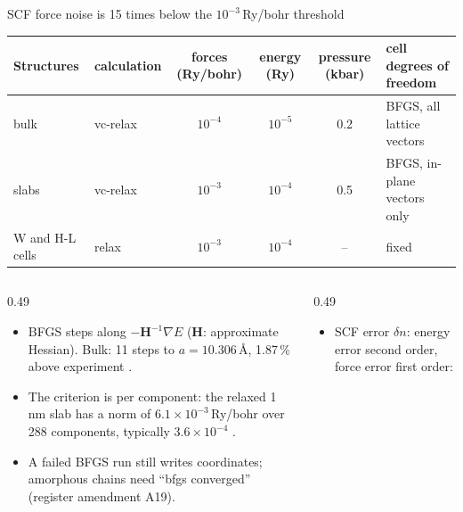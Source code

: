 \begin{frame}[t]{SCF force noise is 15 times below the $10^{-3}$\,Ry/bohr threshold}
  \fivedense\fiveTop
  \vspace{-1.8mm}
  \begingroup\scriptsize
  \renewcommand{\arraystretch}{0.95}
  \begin{tabularx}{\textwidth}{@{}l l c c c X@{}}
    \toprule
    Structures & calculation & forces (Ry/bohr) & energy (Ry) & pressure (kbar) & cell degrees of freedom \\
    \midrule
    bulk \InO{} & vc-relax & $10^{-4}$ & $10^{-5}$ & 0.2 & BFGS, all lattice vectors \\
    slabs & vc-relax & $10^{-3}$ & $10^{-4}$ & 0.5 & BFGS, in-plane vectors only \\
    W and H-L cells & relax & $10^{-3}$ & $10^{-4}$ & -- & fixed \\
    \bottomrule
  \end{tabularx}\par\endgroup
  \vspace{-1.5mm}
  \begin{columns}[T,onlytextwidth]
    \begin{column}{0.49\textwidth}
      \begin{itemize}
        \item BFGS steps along $-\mathbf{H}^{-1}\nabla E$ ($\mathbf{H}$: approximate Hessian).
          Bulk: 11 steps to $a = 10.306$\,\AA, 1.87\,\% above experiment .
        \item The criterion is per component: the relaxed 1\,nm slab has a norm of $6.1\times10^{-3}$\,Ry/bohr over
          288 components, typically $3.6\times10^{-4}$ .
        \item A failed BFGS run still writes coordinates; amorphous chains need ``bfgs converged''
          (register amendment A19).
      \end{itemize}
    \end{column}
    \begin{column}{0.49\textwidth}
      \begin{itemize}
        \item SCF error $\delta n$: energy error second order, force error first order:

\end{itemize}
\end{column}
\end{columns}
\end{frame}
